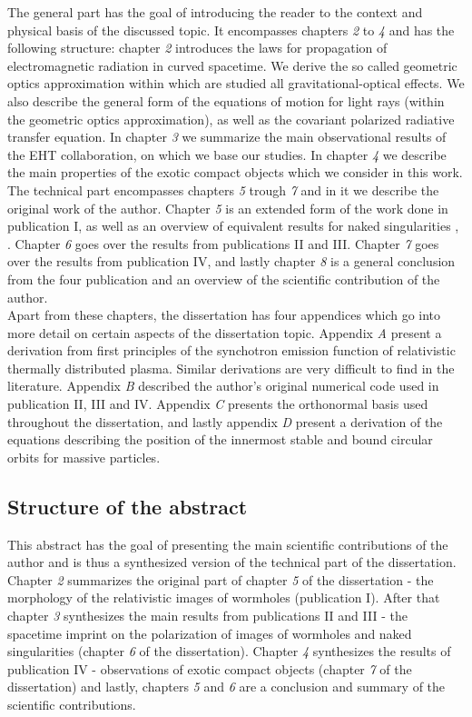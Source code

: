 \documentclass[12pt]{article}
\numberwithin{equation}{section}
\numberwithin{figure}{section}
\begin{document}
	The general part has the goal of introducing the reader to the context and physical basis of the discussed topic. It encompasses chapters \emph{2} to \emph{4} and has the following structure: chapter \emph{2} introduces the laws for propagation of electromagnetic radiation in curved spacetime. We derive the so called geometric optics approximation within which are studied all gravitational-optical effects. We also describe the general form of the equations of motion for light rays (within the geometric optics approximation), as well as the covariant polarized radiative transfer equation. In chapter \emph{3} we summarize the main observational results of the EHT collaboration, on which we base our studies. In chapter \emph{4} we describe the main properties of the exotic compact objects which we consider in this work.\\
	
	The technical part encompasses chapters \emph{5} trough \emph{7} and in it we describe the original work of the author. Chapter \emph{5} is an extended form of the work done in publication I, as well as an overview of equivalent results for naked singularities \cite{Gyulchev2020}, \cite{Gyulchev2021}. Chapter \emph{6} goes over the results from publications II and III. Chapter \emph{7} goes over the results from publication IV, and lastly chapter \emph{8} is a general conclusion from the four publication and an overview of the scientific contribution of the author.\\
	
	Apart from these chapters, the dissertation has four appendices which go into more detail on certain aspects of the dissertation topic. Appendix \emph{A} present a derivation from first principles of the synchotron emission function of relativistic thermally distributed plasma. Similar derivations are very difficult to find in the literature. Appendix \emph{B} described the author's original numerical code used in publication II, III and IV. Appendix \emph{C} presents the orthonormal basis used throughout the dissertation, and lastly appendix \emph{D} present a derivation of the equations describing the position of the innermost stable and bound circular orbits for massive particles. 
	
	\subsection{Structure of the abstract}
	
	This abstract has the goal of presenting the main scientific contributions of the author and is thus a synthesized version of the technical part of the dissertation. Chapter \emph{2} summarizes the original part of chapter \emph{5} of the dissertation - the morphology of the relativistic images of wormholes (publication I). After that chapter \emph{3} synthesizes the main results from publications II and III - the spacetime imprint on the polarization of images of wormholes and naked singularities (chapter \emph{6} of the dissertation). Chapter \emph{4} synthesizes the results of publication IV - observations of exotic compact objects (chapter \emph{7} of the dissertation) and lastly, chapters \emph{5} and \emph{6} are a conclusion and summary of the scientific contributions.
	
\end{document}
